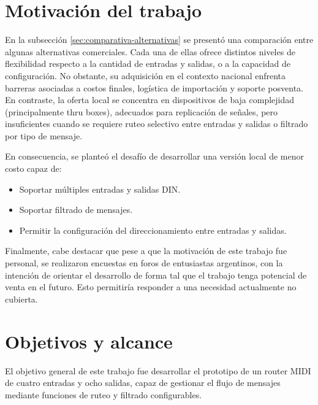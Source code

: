
\section{Motivación del trabajo}
\label{motivacion}

En la subsección \ref{sec:comparativa-alternativas} se presentó una comparación entre algunas alternativas comerciales. Cada una de ellas ofrece distintos niveles de flexibilidad respecto a la cantidad de entradas y salidas, o a la capacidad de configuración. No obstante, su adquisición en el contexto nacional enfrenta barreras asociadas a costos finales, logística de importación y soporte posventa. En contraste, la oferta local se concentra en dispositivos de baja complejidad (principalmente thru boxes), adecuados para replicación de señales, pero insuficientes cuando se requiere ruteo selectivo entre entradas y salidas o filtrado por tipo de mensaje.

En consecuencia, se planteó el desafío de desarrollar una versión local de menor costo capaz de:
\begin{itemize}
	\item Soportar múltiples entradas y salidas DIN.
	\item Soportar filtrado de mensajes.
	\item Permitir la configuración del direccionamiento entre entradas y salidas.
\end{itemize}

Finalmente, cabe destacar que pese a que la motivación de este trabajo fue personal, se realizaron encuestas en foros de entusiastas argentinos, con la intención de orientar el desarrollo de forma tal que el trabajo tenga potencial de venta en el futuro. Esto permitiría responder a una necesidad actualmente no cubierta.


\section{Objetivos y alcance}
\label{objetivos-alcance}

El objetivo general de este trabajo fue desarrollar el prototipo de un router MIDI de cuatro entradas y ocho salidas, capaz de gestionar el flujo de mensajes mediante funciones de ruteo y filtrado configurables.

